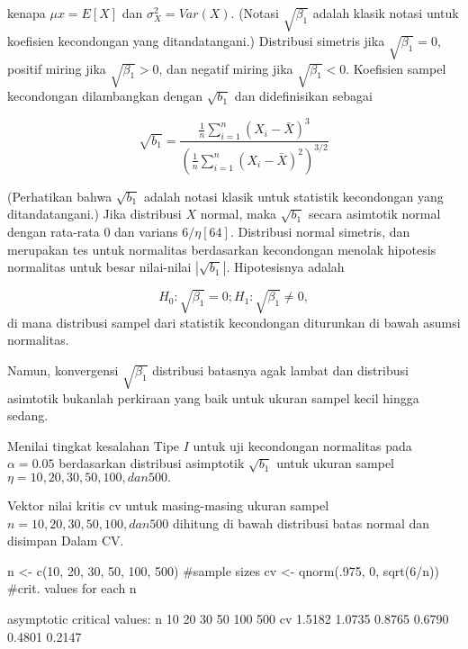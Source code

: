 \documentclass[a4paper,12pt]{article}
\theoremstyle{definition}
\begin{document}
kenapa $\mu x = E\left [ X \right ]$ dan $\sigma ^{2}_{X} = Var (X)$. (Notasi $\sqrt{\beta _{1}}$ adalah klasik notasi untuk koefisien kecondongan yang ditandatangani.)  Distribusi simetris jika $\sqrt{\beta _{1}}=0$, positif miring jika $\sqrt{\beta _{1}} > 0$, dan negatif miring jika $\sqrt{\beta _{1}} < 0$. Koefisien sampel kecondongan dilambangkan dengan $\sqrt{b_{1}}$ dan  didefinisikan sebagai

\begin{equation}
    \sqrt{b_{1}}= \frac{\frac{1}{n}\sum_{i=1}^{n}\left ( X_{i}-\bar{X} \right )^{3}}{(\frac{1}{n}\sum_{i=1}^{n}\left ( X_{i}-\bar{X} \right )^{2})^{3/2}}
\end{equation}

(Perhatikan bahwa $\sqrt{b_{1}}$ adalah notasi klasik untuk statistik kecondongan yang ditandatangani.) Jika distribusi $X$ normal, maka $\sqrt{b_{1}}$ secara asimtotik normal dengan rata-rata $0$ dan varians $6/\eta [64]$. Distribusi normal simetris, dan merupakan tes untuk normalitas berdasarkan kecondongan menolak hipotesis normalitas untuk besar nilai-nilai $ \left | \sqrt{b_{1}} \right |$. Hipotesisnya adalah

\begin{equation}
    H_{0} : \sqrt{\beta _{1}} = 0; H_{1} : \sqrt{\beta _{1}}\neq 0,
\end{equation}
di mana distribusi sampel dari statistik kecondongan diturunkan di bawah asumsi normalitas.

Namun, konvergensi $\sqrt{\beta _{1}}$ distribusi batasnya agak lambat dan distribusi asimtotik bukanlah perkiraan yang baik untuk ukuran sampel kecil hingga sedang.

Menilai tingkat kesalahan Tipe $I$ untuk uji kecondongan normalitas pada $\alpha = 0.05$ berdasarkan distribusi asimptotik $\sqrt{b_{1}}$ untuk ukuran sampel $\eta = 10, 20, 30, 50, 100, dan 500.$

Vektor nilai kritis cv untuk masing-masing ukuran sampel $n = 10, 20, 30, 50, 100, dan 500$  dihitung di bawah distribusi batas normal dan disimpan Dalam CV.

\begin{spverbatim}
    n <- c(10, 20, 30, 50, 100, 500) #sample sizes
    cv <- qnorm(.975, 0, sqrt(6/n)) #crit. values for each n
    
    asymptotic critical values:
    n    10     20     30     50     100    500
    cv 1.5182 1.0735 0.8765 0.6790 0.4801 0.2147
\end{spverbatim}
\end{document}
